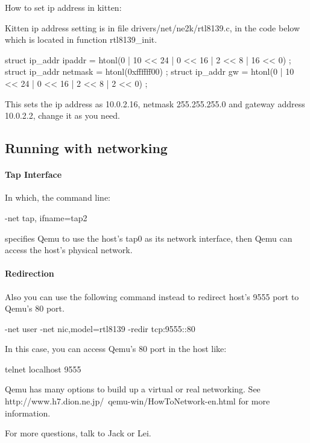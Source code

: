 \documentclass[11pt]{article}
\begin{document}
How to set ip address in kitten:

Kitten ip address setting is in file drivers/net/ne2k/rtl8139.c, in the code below which is located in function rtl8139\_init.

  struct ip\_addr ipaddr = { htonl(0 | 10 << 24 | 0 << 16 | 2 << 8 | 16 << 0) }; 
  struct ip\_addr netmask = { htonl(0xffffff00) }; 
  struct ip\_addr gw = { htonl(0 | 10 << 24 | 0 << 16 | 2 << 8 | 2 << 0) };

This sets the ip address as 10.0.2.16, netmask 255.255.255.0 and gateway address 10.0.2.2, change it as you need.



\subsection{Running with networking}

\paragraph*{Tap Interface}
In which, the command line: 

-net tap, ifname=tap2

specifies Qemu to use the host's tap0 as its network interface, then Qemu can access the host's physical network.

\paragraph*{Redirection}

Also you can use the following command instead to redirect host's 9555 port to Qemu's 80 port.

-net user -net nic,model=rtl8139  -redir tcp:9555::80

In this case, you can access Qemu's 80 port in the host like:

telnet localhost 9555

Qemu has many options to build up a virtual or real networking. See http://www.h7.dion.ne.jp/~qemu-win/HowToNetwork-en.html for more information.






For more questions, talk to Jack or Lei.
\end{document}
